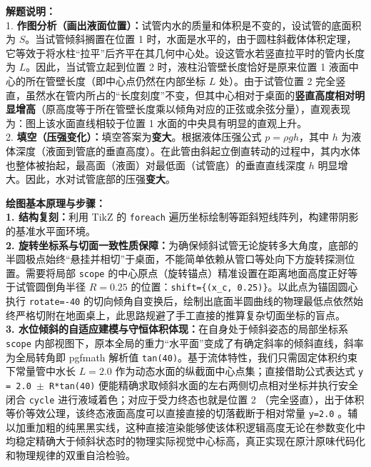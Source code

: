 \vspace{0.6cm}

{\small\color{gray}
\textbf{解题说明：}\\
1. \textbf{作图分析（画出液面位置）：}试管内水的质量和体积是不变的，设试管的底面积为 $S$。当试管倾斜搁置在位置 1 时，水面是水平的，由于圆柱斜截体体积定理，它等效于将水柱“拉平”后齐平在其几何中心处。设这管水若竖直拉平时的管内长度为 $L$。因此，当试管立起到位置 2 时，液柱沿管壁长度恰好是原来位置 1 液面中心的所在管壁长度（即中心点仍然在内部坐标 $L$ 处）。由于试管位置 2 完全竖直，虽然水在管内所占的“长度刻度”不变，但其中心相对于桌面的\textbf{竖直高度相对明显增高}（原高度等于所在管壁长度乘以倾角对应的正弦或余弦分量），直观表现为：图上该水面直线相较于位置 1 水面的中央具有明显的直观上升。\\
2. \textbf{填空（压强变化）：}填空答案为\textbf{变大}。根据液体压强公式 $p = \rho g h$，其中 $h$ 为液体深度（液面到管底的垂直高度）。在此管由斜起立倒直转动的过程中，其内水体也整体被抬起，最高面（液面）对最低面（试管底）的垂直直线深度 $h$ 明显增大。因此，水对试管底部的压强\textbf{变大}。
}

\vspace{0.6cm}

{\small\color{blue!70!black}
\textbf{绘图基本原理与步骤：}\\
\textbf{1. 结构复刻：}利用 TikZ 的 \texttt{foreach} 遍历坐标绘制等距斜短线阵列，构建带阴影的基准水平面环境。\\
\textbf{2. 旋转坐标系与切面一致性质保障：}为确保倾斜试管无论旋转多大角度，底部的半圆极点始终“悬挂并相切”于桌面，不能简单依赖从管口等处向下方旋转探测位置。需要将局部 \texttt{scope} 的中心原点（旋转锚点）精准设置在距离地面高度正好等于试管圆倒角半径 $R=0.25$ 的位置：\texttt{shift=\{(x\_c, 0.25)\}}。以此点为锚固圆心执行 \texttt{rotate=-40} 的切向倾角自变换后，绘制出底面半圆曲线的物理最低点依然始终严格切附在地面桌上，此思路规避了手工直接的推算复杂切面坐标的盲点。\\
\textbf{3. 水位倾斜的自适应建模与守恒体积体现：}在自身处于倾斜姿态的局部坐标系 \texttt{scope} 内部视图下，原本全局的重力“水平面”变成了有确定斜率的倾斜直线，斜率为全局转角即 pgfmath 解析值 \texttt{tan(40)}。基于流体特性，我们只需固定体积约束下常量管中水长 $L=2.0$ 作为动态水面的纵截面中心点集；直接借助公式表达式 \texttt{y = 2.0 $\pm$ R*tan(40)} 便能精确求取倾斜水面的左右两侧切点相对坐标并执行安全闭合 \texttt{cycle} 进行液域着色；对应于受力终态也就是位置 2 （完全竖直），出于体积等价等效公理，该终态液面高度可以直接直接的切落截断于相对常量 \texttt{y=2.0} 。辅以加重加粗的纯黑黑实线，这种直接渲染能够使该体积逻辑高度无论在参数变化中均稳定精确大于倾斜状态时的物理实际视觉中心标高，真正实现在原汁原味代码化和物理规律的双重自洽检验。
}

